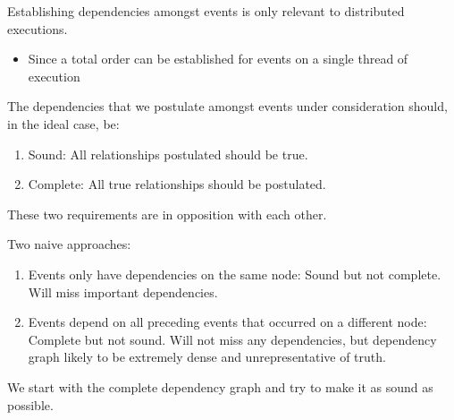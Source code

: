 Establishing dependencies amongst events is only relevant to distributed executions.
\begin{itemize}
\item Since a total order can be established for events on a single thread of execution
\end{itemize}

The dependencies that we postulate amongst events under consideration should, in the ideal case, be:
\begin{enumerate}
\item Sound:  
All relationships postulated should be true.
\item Complete:
All true relationships should be postulated.
\end{enumerate}

These two requirements are in opposition with each other. 

Two naive approaches:
\begin{enumerate}
\item Events only have dependencies on the same node: 
Sound but not complete. Will miss important dependencies. 

\item Events depend on all preceding events that occurred on a different node: 
Complete but not sound. Will not miss any dependencies, but dependency graph likely to be extremely dense and unrepresentative of truth.
\end{enumerate}

We start with the complete dependency graph and try to make it as sound as possible. 

